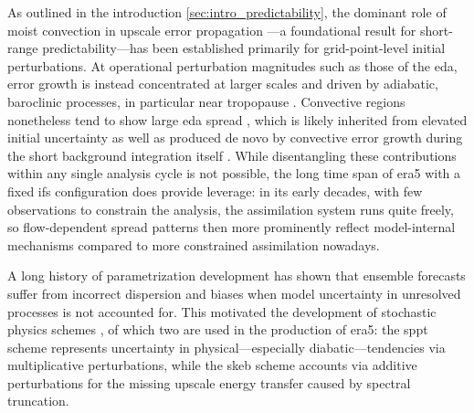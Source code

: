 As outlined in the introduction \cref{sec:intro_predictability}, the dominant role of moist convection in upscale error propagation \parencite{selzUpscaleErrorGrowth2015, selzEstimatingIntrinsicLimit2019, judtInsightsAtmosphericPredictability2018, bechtoldRoleShallowConvection2014, zhangMesoscalePredictabilityMoist2007}---a foundational result for short-range predictability---has been established primarily for grid-point-level initial perturbations. At operational perturbation magnitudes such as those of the \gls{eda}, error growth is instead concentrated at larger scales and driven by adiabatic, baroclinic processes, in particular near tropopause \parencite{selzTransitionPracticalIntrinsic2022, rodwellUncertaintyGrowthForecast2023, baumgartQuantitativeViewProcesses2019}. Convective regions nonetheless tend to show large \gls{eda} spread \parencite{zagarGlobalPerspectiveLimits2017}, which is likely inherited from elevated initial uncertainty as well as produced de novo by convective error growth during the short background integration itself \parencite{cardinaliRepresentingModelError2014}. While disentangling these contributions within any single analysis cycle
is not possible, the long time span of \gls{era5} with a fixed \gls{ifs} configuration
does provide leverage: in its early decades, with few observations to
constrain the analysis, the assimilation system runs quite freely, so
flow-dependent spread patterns then more prominently reflect model-internal mechanisms compared to more constrained assimilation nowadays.

A long history of parametrization development \parencite{christensenParametrizationWeatherClimate2022} has shown that ensemble forecasts suffer from incorrect dispersion and biases when model uncertainty in unresolved processes is not accounted for. This motivated the development of stochastic physics schemes \parencite{palmerStochasticWeatherClimate2019}, of which two are used in the production of \gls{era5}: the \gls{sppt} scheme \parencite{buizzaStochasticRepresentationModel1999, lockTreatmentModelUncertainty2019, leutbecherStochasticRepresentationsModel2017} represents uncertainty in physical---especially diabatic---tendencies via multiplicative perturbations, while the \gls{skeb} scheme \parencite{shuttsKineticEnergyBackscatter2005, bernerSpectralStochasticKinetic2009} accounts via additive perturbations for the missing upscale energy transfer caused by spectral truncation.

